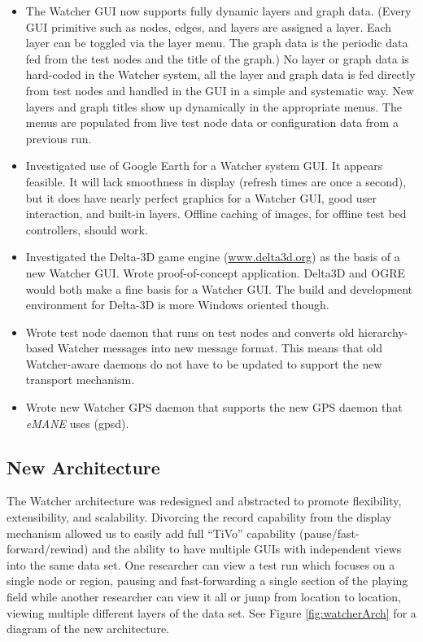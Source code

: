 \documentclass{report}
\begin{document}
\begin{itemize}
\item The Watcher GUI now supports fully dynamic layers and graph data. (Every GUI primitive such as nodes, edges, and layers are assigned a layer. Each layer can be
toggled via the layer menu. The graph data is the periodic data fed from the test nodes and the title of the graph.) No layer or graph data is hard-coded in the Watcher system, all 
the layer and graph data is fed directly from test nodes and handled in the GUI in a simple and systematic way. New layers and graph titles show up dynamically in the appropriate 
menus. The menus are populated from live test node data or configuration data from a previous run.
\item Investigated use of Google Earth for a Watcher system GUI. It appears feasible. It will lack smoothness in display (refresh times are once a second), but it 
does have nearly perfect graphics for a Watcher GUI, good user interaction, and built-in layers. Offline caching of images, for offline test bed controllers, should work. 
\item Investigated the Delta-3D game engine (\url{www.delta3d.org}) as the basis of a new Watcher GUI. Wrote proof-of-concept application. Delta3D and OGRE would both make 
a fine basis for a Watcher GUI. The build and development environment for Delta-3D is more Windows oriented though. 
\item Wrote test node daemon that runs on test nodes and converts old hierarchy-based Watcher messages into new message format. 
This means that old Watcher-aware daemons do not have to be updated to support the new transport mechanism.
\item Wrote new Watcher GPS daemon that supports the new GPS daemon that {\it eMANE} uses (gpsd). 
\end{itemize}

\subsection{New Architecture}
\label{newArch}

The Watcher architecture was redesigned and abstracted to promote flexibility, extensibility, and scalability.  Divorcing the record 
capability from the display mechanism allowed us to easily add full ``TiVo'' capability (pause\slash fast-forward\slash rewind) and the ability to have multiple 
GUIs with independent views into the same data set. One researcher can view a test run which focuses on a single node or region, 
pausing and fast-forwarding a single section of the playing field while another researcher can view it all or jump from 
location to location, viewing multiple different layers of the data set. See Figure \ref{fig:watcherArch} for a diagram 
of the new architecture.
\end{document}
